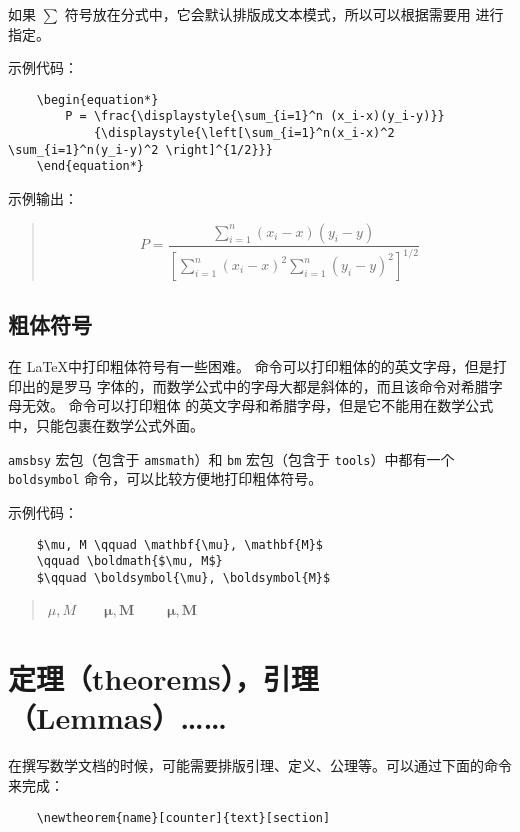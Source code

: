 \documentclass[UTF8]{ctexart}
\begin{document}
如果 $\sum$ 符号放在分式中，它会默认排版成文本模式，所以可以根据需要用 \texttt{\displaystyle}
进行指定。

示例代码：
\begin{verbatim}
    \begin{equation*}
        P = \frac{\displaystyle{\sum_{i=1}^n (x_i-x)(y_i-y)}}
            {\displaystyle{\left[\sum_{i=1}^n(x_i-x)^2 \sum_{i=1}^n(y_i-y)^2 \right]^{1/2}}}
    \end{equation*}
\end{verbatim}

示例输出：
\begin{quote}
    \begin{equation*}
        P = \frac{\displaystyle{\sum_{i=1}^n (x_i-x)(y_i-y)}}
            {\displaystyle{\left[\sum_{i=1}^n(x_i-x)^2 \sum_{i=1}^n(y_i-y)^2 \right]^{1/2}}}
    \end{equation*}
\end{quote}

\subsection{粗体符号}
在 \LaTeX 中打印粗体符号有一些困难。\texttt{\mathbf} 命令可以打印粗体的的英文字母，但是打印出的是罗马
字体的，而数学公式中的字母大都是斜体的，而且该命令对希腊字母无效。\texttt{\boldmath} 命令可以打印粗体
的英文字母和希腊字母，但是它不能用在数学公式中，只能包裹在数学公式外面。

\texttt{amsbsy} 宏包（包含于 \texttt{amsmath}）和 \texttt{bm} 宏包（包含于 \texttt{tools}）中都有一个
\texttt{boldsymbol} 命令，可以比较方便地打印粗体符号。

示例代码：
\begin{verbatim}
    $\mu, M \qquad \mathbf{\mu}, \mathbf{M}$
    \qquad \boldmath{$\mu, M$}
    $\qquad \boldsymbol{\mu}, \boldsymbol{M}$
\end{verbatim}

\begin{quote}
    $\mu, M \qquad \mathbf{\mu}, \mathbf{M}$
    \qquad {}
    $\qquad \boldsymbol{\mu}, \boldsymbol{M}$
\end{quote}

\section{定理（theorems），引理（Lemmas）……}
在撰写数学文档的时候，可能需要排版引理、定义、公理等。可以通过下面的命令来完成：
\begin{verbatim}
    \newtheorem{name}[counter]{text}[section]
\end{verbatim}
\end{document}

